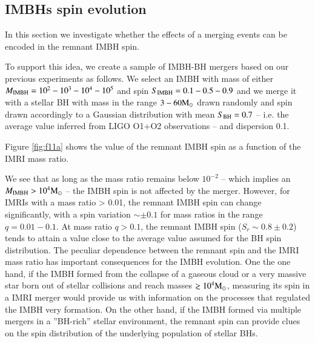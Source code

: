 \documentclass[article]{aa}
\newcommand{\Ms}{{\rm M}_\odot}
\newcommand{\ibh}{{\rm IMBH}}
\newcommand{\bh}{{\rm BH}}
\begin{document}
\subsection{IMBHs spin evolution}
{\bf 

In this section we investigate whether the effects of a merging events can be encoded in the remnant IMBH spin.

To support this idea, we create a sample of IMBH-BH mergers based on our previous experiments as follows. We select an IMBH with mass of either $M_\ibh = 10^2 - 10^3 - 10^4 - 10^5$ and spin $S_\ibh = 0.1 - 0.5 - 0.9$ and we merge it with a stellar BH with mass in the range $3 - 60 \Ms$ drawn randomly and spin drawn accordingly to a Gaussian distribution with mean $S_\bh = 0.7$ -- i.e. the average value inferred from LIGO O1+O2 observations -- and dispersion 0.1. 

Figure \ref{fig:f11a} shows the value of the remnant IMBH spin as a function of the IMRI mass ratio. 

We see that as long as the mass ratio remains below $10^{-2}$ -- which implies an $M_\ibh > 10^4 \Ms$ -- the IMBH spin is not affected by the merger. However, for IMRIs with a mass ratio > 0.01, the remnant IMBH spin can change significantly, with a spin variation $\sim \pm 0.1$ for mass ratios in the range $q = 0.01-0.1$. At mass ratio $q>0.1$, the remnant IMBH spin ($S_r \sim 0.8\pm 0.2$) tends to attain a value close to the average value assumed for the BH spin distribution.
The peculiar dependence between the remnant spin and the IMRI mass ratio has important consequences for the IMBH evolution. One the one hand, if the IMBH formed from the collapse of a gaseous cloud or a very massive star born out of stellar collisions and reach masses $\gtrsim 10^4\Ms$, measuring its spin in a IMRI merger would provide us with information on the processes that regulated the IMBH very formation. On the other hand,
if the IMBH formed via multiple mergers in a ''BH-rich'' stellar environment, the remnant spin can provide clues on the spin distribution of the underlying population of stellar BHs.

}
\end{document}
